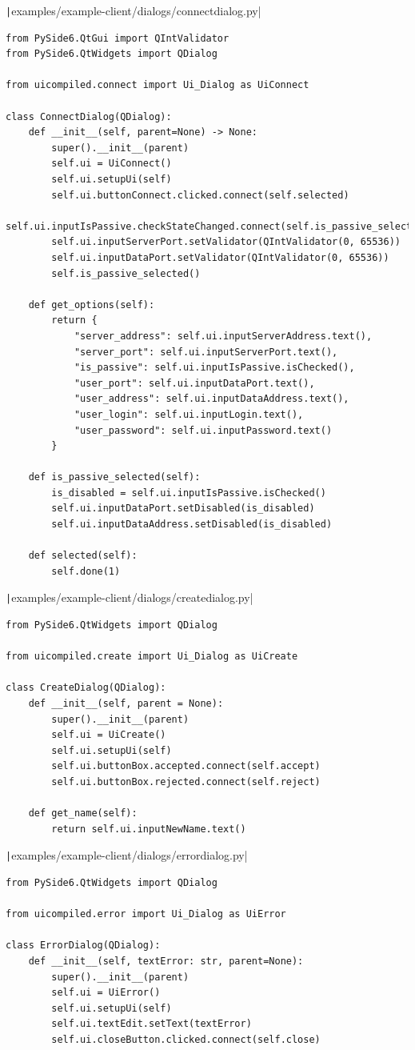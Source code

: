 \documentclass[a4paper,14pt]{extarticle}
\begin{document}
\texttt|examples/example-client/dialogs/connectdialog.py|
\begin{verbatim}
from PySide6.QtGui import QIntValidator
from PySide6.QtWidgets import QDialog

from uicompiled.connect import Ui_Dialog as UiConnect

class ConnectDialog(QDialog):
    def __init__(self, parent=None) -> None:
        super().__init__(parent)
        self.ui = UiConnect()
        self.ui.setupUi(self)
        self.ui.buttonConnect.clicked.connect(self.selected)
        self.ui.inputIsPassive.checkStateChanged.connect(self.is_passive_selected)
        self.ui.inputServerPort.setValidator(QIntValidator(0, 65536))
        self.ui.inputDataPort.setValidator(QIntValidator(0, 65536))
        self.is_passive_selected()

    def get_options(self):
        return {
            "server_address": self.ui.inputServerAddress.text(),
            "server_port": self.ui.inputServerPort.text(),
            "is_passive": self.ui.inputIsPassive.isChecked(),
            "user_port": self.ui.inputDataPort.text(),
            "user_address": self.ui.inputDataAddress.text(),
            "user_login": self.ui.inputLogin.text(),
            "user_password": self.ui.inputPassword.text()
        }

    def is_passive_selected(self):
        is_disabled = self.ui.inputIsPassive.isChecked()
        self.ui.inputDataPort.setDisabled(is_disabled)
        self.ui.inputDataAddress.setDisabled(is_disabled)

    def selected(self):
        self.done(1)
\end{verbatim}
\texttt|examples/example-client/dialogs/createdialog.py|
\begin{verbatim}
from PySide6.QtWidgets import QDialog

from uicompiled.create import Ui_Dialog as UiCreate

class CreateDialog(QDialog):
    def __init__(self, parent = None):
        super().__init__(parent)
        self.ui = UiCreate()
        self.ui.setupUi(self)
        self.ui.buttonBox.accepted.connect(self.accept)
        self.ui.buttonBox.rejected.connect(self.reject)

    def get_name(self):
        return self.ui.inputNewName.text()
\end{verbatim}
\texttt|examples/example-client/dialogs/errordialog.py|
\begin{verbatim}
from PySide6.QtWidgets import QDialog

from uicompiled.error import Ui_Dialog as UiError

class ErrorDialog(QDialog):
    def __init__(self, textError: str, parent=None):
        super().__init__(parent)
        self.ui = UiError()
        self.ui.setupUi(self)
        self.ui.textEdit.setText(textError)
        self.ui.closeButton.clicked.connect(self.close)
\end{verbatim}
\end{document}
